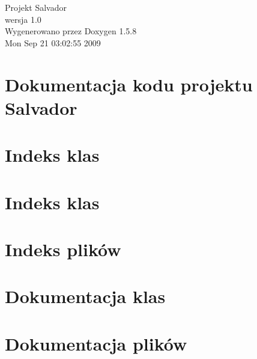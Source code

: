 \documentclass[a4paper]{book}
\begin{document}
\begin{titlepage}
\vspace*{7cm}
\begin{center}
{\Large Projekt Salvador \\[1ex]\large wersja 1.0 }\\
\vspace*{1cm}
{\large Wygenerowano przez Doxygen 1.5.8}\\
\vspace*{0.5cm}
{\small Mon Sep 21 03:02:55 2009}\\
\end{center}
\end{titlepage}
\clearemptydoublepage
{}
\tableofcontents
\clearemptydoublepage
{}
\chapter{Dokumentacja kodu projektu Salvador}
\label{index}\hypertarget{index}{}
\chapter{Indeks klas}

\chapter{Indeks klas}

\chapter{Indeks plików}

\chapter{Dokumentacja klas}










\chapter{Dokumentacja plików}
























\printindex
\end{document}
